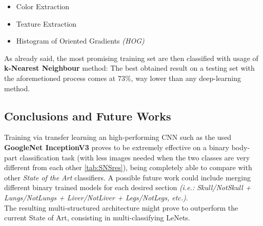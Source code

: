 \documentclass[../main.tex]{subfiles}
\begin{document}
\begin{itemize}
	\item Color Extraction
	\item Texture Extraction
	\item Histogram of Oriented Gradients \textit{(HOG)}
\end{itemize}
As already said, the most promising training set are then classified with usage of \textbf{k-Nearest Neighbour} method: The best obtained result on a testing set with the aforemetioned process comes at 73\%, way lower than any deep-learning method.
\vspace{5mm}
\subsection{Conclusions and Future Works}
Training via transfer learning an high-performing CNN such as the used \textbf{GoogleNet InceptionV3} proves to be extremely effective on a binary body-part classification task (with less images needed when the two classes are very different from each other \ref{tab:SNSres}), being completely able to compare with other \textit{State of the Art} classifiers. A possible future work could include merging different binary trained models for each desired section \textit{(i.e.: Skull/NotSkull + Lungs/NotLungs + Liver/NotLiver + Legs/NotLegs, etc.)}. \\
The resulting multi-structured architecture might prove to outperform the current State of Art, consisting in multi-classifying LeNets.
\end{document}
